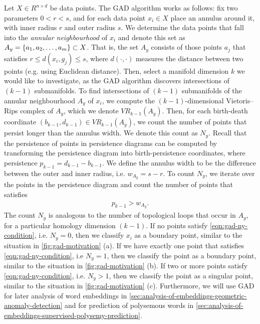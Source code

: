 Let $X \in R^{n \times d}$ be data points. The GAD algorithm works as follows: fix two parameters $0 < r < s$, and for each data point $x_i \in X$ place an annulus around it, with inner radius $r$ and outer radius $s$. We determine the data points that fall into the \textit{annular neighbourhood} of $x_i$ and denote this set as $A_y = \left\{a_1, a_2, \ldots, a_m\right\} \subset X$. That is, the set $A_y$ consists of those points $a_j$ that satisfies $r \leq d(x_i, g_j) \leq s$, where $d(\cdot, \cdot)$ measures the distance between two points (e.g. using Euclidean distance). Then, select a manifold dimension $k$ we would like to investigate, as the GAD algorithm discovers intersections of $(k-1)$ submanifolds. To find intersections of $(k-1)$ submanifolds of the annular neighbourhood $A_y$ of $x_i$, we compute the $(k-1)$-dimensional Vietoris–Rips complex of $A_y$, which we denote $VR_{k-1}(A_y)$. Then, for each birth-death coordinate $(b_{k-1}, d_{k-1}) \in VR_{k-1}(A_y)$, we count the number of points that persist longer than the annulus width. We denote this count as $N_y$. Recall that the persistence of points in persistence diagrams can be computed by transforming the persistence diagram into birth-persistence coordinates, where persistence $p_{k-1} = d_{k-1} - b_{k-1}$. We define the annulus width to be the difference between the outer and inner radius, i.e. $w_{A_y} = s - r$. To count $N_y$, we iterate over the points in the persistence diagram and count the number of points that satisfies
\begin{align}
    p_{k-1} > w_{A_y}.
    \label{eqn:gad-ny-condition}
\end{align}
The count $N_y$ is analogous to the number of topological loops that occur in $A_y$, for a particular homology dimension $(k-1)$. If no points satisfy \cref{eqn:gad-ny-condition}, i.e. $N_y=0$, then we classify $x_i$ as a boundary point, similar to the situation in \cref{fig:gad-motivation} (a). If we have exactly one point that satisfies \cref{eqn:gad-ny-condition}, i.e $N_y=1$, then we classify the point as a boundary point, similar to the situation in \cref{fig:gad-motivation} (b). If two or more points satisfy \cref{eqn:gad-ny-condition}, i.e. $N_y>1$, then we classify the point as a singular point, similar to the situation in \cref{fig:gad-motivation} (c). Furthermore, we will use GAD for later analysis of word embeddings in \cref{sec:analysis-of-embeddings-geometric-anomaly-detection} and for prediction of polysemous words in \cref{sec:analysis-of-embeddings-supervised-polysemy-prediction}. 